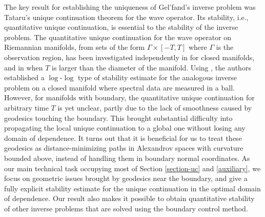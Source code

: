\documentclass[11pt,letterpaper]{amsart}
\numberwithin{equation}{section}
\theoremstyle{definition}
\theoremstyle{plain}
\theoremstyle{definition}
\theoremstyle{plain}
\theoremstyle{definition}
\theoremstyle{plain}
\begin{document}
The key result for establishing the uniqueness of Gel'fand's inverse problem was Tataru's unique continuation theorem \cite{T} for the wave operator. Its stability, i.e., quantitative unique continuation, is essential to the stability of the inverse problem. The quantitative unique continuation for the wave operator on Riemannian manifolds, from sets of the form $\Gamma \times [-T,T]$ where $\Gamma$ is the observation region, has been investigated independently in \cite{BKL2,BKL1} for closed manifolds, and in \cite{LL} when $T$ is larger than the diameter of the manifold. Using \cite{BKL2,BKL1}, the authors established a $\log$-$\log$ type of stability estimate \cite{BKL3} for the analogous inverse problem on a closed manifold where spectral data are measured in a ball. However, for manifolds with boundary, the quantitative unique continuation for arbitrary time $T$ is yet unclear, partly due to the lack of smoothness caused by geodesics touching the boundary.
This brought substantial difficulty into propagating the local unique continuation to a global one without losing any domain of dependence.
It turns out that it is beneficial for us to treat these geodesics as distance-minimizing paths in Alexandrov spaces with curvature bounded above, instead of handling them in boundary normal coordinates.
As our main technical task occupying most of Section \ref{section-uc} and \ref{auxiliary}, we focus on geometric issues brought by geodesics near the boundary, and give a fully explicit stability estimate for the unique continuation in the optimal domain of dependence.
Our result also makes it possible to obtain quantitative stability of other inverse problems that are solved using the boundary control method.
\end{document}
